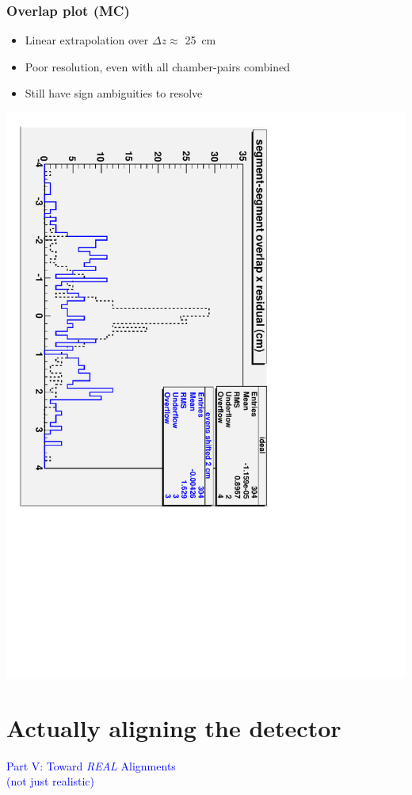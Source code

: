 \documentclass[compress]{beamer}
\begin{document}
\begin{frame}
\frametitle{Overlap plot (MC)}
\begin{itemize}
\item Linear extrapolation over $\Delta z \approx$ 25~cm
\item Poor resolution, even with all chamber-pairs combined
\item Still have sign ambiguities to resolve
\end{itemize}
\begin{center}
\includegraphics[height=0.8\linewidth, angle=90]{overlap_residual_noMTCC.pdf}
\end{center}
\end{frame}

\section*{Actually aligning the detector}

\begin{frame}
\begin{center}
\Huge \textcolor{blue}{\sc Part V: Toward {\it REAL} Alignments} \\ \textcolor{blue}{(not just realistic)}
\end{center}
\end{frame}
\end{document}
